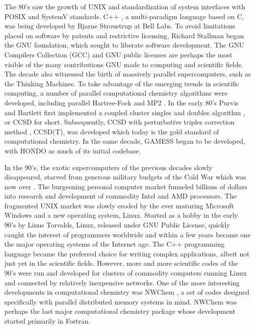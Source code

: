 \documentclass[12pt]{book} \usepackage[margin=1in]{geometry}
\begin{document}
The 80's saw the growth of UNIX and standardization of system
interfaces with POSIX and SystemV \cite{isaak1990standards}
standards.  C++ \cite{c++}, a multi-paradigm language based on C, was
being developed by Bjarne Stroustrup at Bell Labs.  To avoid
limitations placed on software by patents and restrictive licensing,
Richard Stallman began the GNU foundation, which sought to liberate
software development.  The GNU Compilers Collection (GCC) and GNU
public licenses are perhaps the most visible of the many contributions
GNU made to computing and scientific fields.  The decade also
witnessed the birth of massively parallel supercomputers, such as the
Thinking Machines.  To take advantage of the emerging trends in
scientific computing, a number of parallel computational chemistry
algorithms were developed, including parallel Hartree-Fock
\cite{dupuis1987parallel} and MP2 \cite{watts1988parallel}.  In the
early 80's Purvis and Bartlett first implemented a coupled cluster
singles and doubles algorithm \cite{purvis1982full}, or CCSD for
short.  Subsequently, CCSD with perturbative triples correction method
\cite{raghavachari1989fifth}, CCSD(T), was developed which today is
the gold standard of computational chemistry.  In the same decade,
GAMESS \cite{gamess} began to be developed, with HONDO as much of its
initial codebase.

In the 90's, the exotic supercomputers of the previous decades slowly
disappeared, starved from generous military budgets of the Cold War
which was now over \cite{nyt92,nyt94}.  The burgeoning personal computer market funneled
billions of dollars into research and development of commodity Intel
and AMD processors.  The fragmented UNIX market was slowly eroded by
the ever maturing Microsoft Windows and a new operating system, Linux.
Started as a hobby in the early 90's by Linus Torvalds, Linux,
released under GNU Public License, quickly caught the interest of
programmers worldwide and within a few years became one the major
operating systems of the Internet age.  The C++ programming language
became the preferred choice for writing complex applications, albeit
not just yet in the scientific fields.  However, more and more
scientific codes of the 90's were run and developed for clusters of
commodity computers running Linux and connected by relatively
inexpensive networks.  One of the more interesting developments in
computational chemistry was NWChem \cite{nwchem}, a set of codes
designed specifically with parallel distributed memory systems in
mind.  NWChem was perhaps the last major computational chemistry
package whose development started primarily in Fortran.
\end{document}
